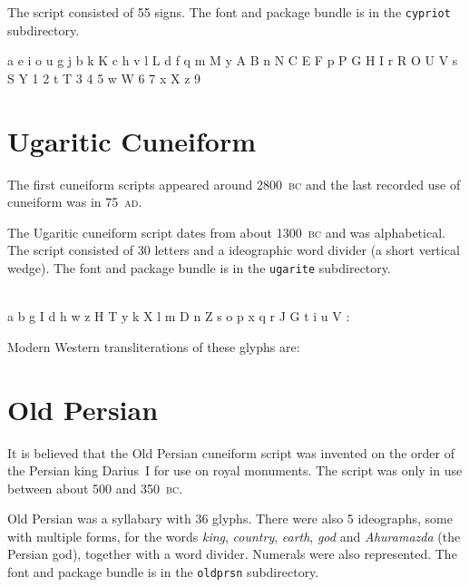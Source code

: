 \documentclass{article}
\newcommand{\BC}{\textsc{bc}}
\newcommand{\AD}{\textsc{ad}}
\begin{document}
    The script consisted of 55 signs. The font and package bundle is
in the \texttt{cypriot} subdirectory.

\begin{center}
\renewcommand{\baselinestretch}{1.2}
\cyprfamily
a e i o u
g
j b
k K c h v
l L d f q
m M y A B
n N C E F
p P G H I
r R O U V
s S Y 1 2
t T 3 4 5
w W 6 7
x X z
9

\end{center}

\section{Ugaritic Cuneiform}

    The first cuneiform scripts appeared around 2800~\BC{} and the last 
recorded use of cuneiform was in 75~\AD.

    The Ugaritic cuneiform script dates from about 1300~\BC{} and
was alphabetical. The script consisted of 30 letters and a ideographic word
divider (a short vertical wedge). The font and package bundle
is in the \texttt{ugarite} subdirectory.

\begin{center}
\cugarfamily
\Aaleph\ \Abeth\ \Agimel\ \Ahu\ \Adaleth\ 
\Ahe\ \Avav\ \Azayin\ \Aheth\ \Ateth\ 
\Ayod\ \Akaph\ \Asa\ \Alamed\ \Amem\ 
\Adb\ \Anun\ \Azd\ \Asamekh\ \Aayin\ 
\Ape\ \Asade\ \Aqoph\ \Aresh\ \Atb\ 
\Agd\ \Atav\ \Ai\ \Au\ \Asg\ \Awd \\
a b g I d h w z H T y k X l m D n Z s o p x q r J G t i u V :
\end{center}

    Modern Western transliterations of these glyphs are:
\begin{center}
\translitcugar{%
\Aaleph\ \Abeth\ \Agimel\ \Ahu\ \Adaleth\ 
\Ahe\ \Avav\ \Azayin\ \Aheth\ \Ateth\ 
\Ayod\ \Akaph\ \Asa\ \Alamed\ \Amem\ 
\Adb\ \Anun\ \Azd\ \Asamekh\ \Aayin\ 
\Ape\ \Asade\ \Aqoph\ \Aresh\ \Atb\ 
\Agd\ \Atav\ \Ai\ \Au\ \Asg\ \Awd 
}
\end{center}

\section{Old Persian}

    It is believed that the Old Persian cuneiform script was invented on
the order of the Persian king Darius~I for use on royal monuments.
The script was only in use between about 500 and 350~\BC.

   Old Persian was a syllabary with 36 glyphs. There were also 5 ideographs,
some with multiple forms, 
for the words \textit{king}, \textit{country}, \textit{earth}, \textit{god}
and \textit{Ahuramazda} (the Persian god), together with a word divider.
Numerals were also represented. 
The font and package bundle is in the \texttt{oldprsn} subdirectory.
\end{document}
